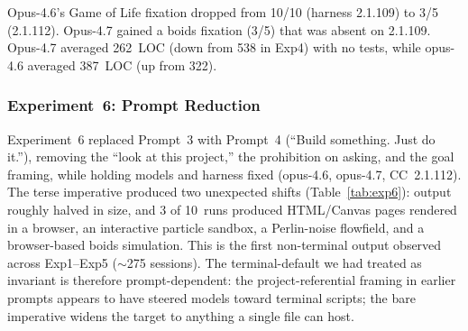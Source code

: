 \documentclass{article}
\begin{document}
\begin{table}[t]
\caption{Experiment~5: harness 2.1.112 (same prompt as Exp3--4).}
\label{tab:exp5}
\small{}
\end{table}

Opus-4.6's Game of Life fixation dropped from 10/10 (harness
2.1.109) to 3/5 (2.1.112). Opus-4.7 gained a boids fixation
(3/5) that was absent on 2.1.109. Opus-4.7 averaged 262~LOC
(down from 538 in Exp4) with no tests, while opus-4.6 averaged
387~LOC (up from 322).

\subsubsection{Experiment~6: Prompt Reduction}

Experiment~6 replaced Prompt~3 with Prompt~4 (``Build something.
Just do it.''), removing the ``look at this project,'' the
prohibition on asking, and the goal framing, while holding models
and harness fixed (opus-4.6, opus-4.7, CC~2.1.112). The terse
imperative produced two unexpected shifts (Table~\ref{tab:exp6}):
output roughly halved in size, and 3 of 10~runs produced
HTML/Canvas pages rendered in a browser, an interactive particle
sandbox, a Perlin-noise flowfield, and a browser-based boids
simulation. This is the first non-terminal output observed across
Exp1--Exp5 ($\sim$275 sessions). The terminal-default we had
treated as invariant is therefore prompt-dependent: the
project-referential framing in earlier prompts appears to have
steered models toward terminal scripts; the bare imperative
widens the target to anything a single file can host.
\end{document}
